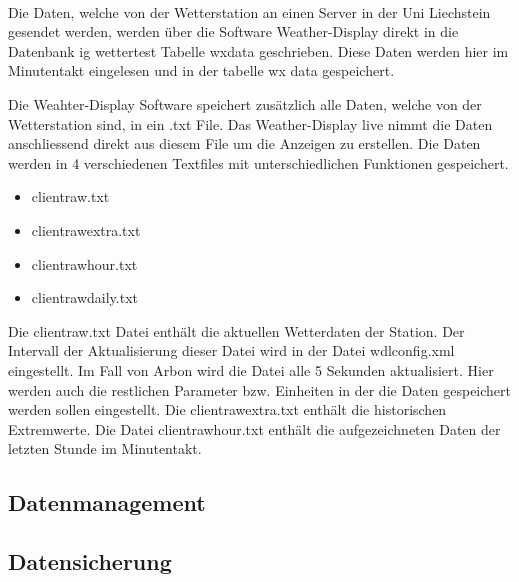 \\

Die Daten, welche von der Wetterstation an einen Server in der Uni Liechstein gesendet werden, werden über die Software Weather-Display direkt in die Datenbank ig wettertest Tabelle wxdata geschrieben. Diese Daten werden hier im Minutentakt eingelesen und in der tabelle wx data gespeichert. 


Die Weahter-Display Software speichert zusätzlich alle Daten, welche von der Wetterstation sind, in ein .txt File. Das Weather-Display live nimmt die Daten anschliessend direkt aus diesem File um die Anzeigen zu erstellen. Die Daten werden in 4 verschiedenen Textfiles mit unterschiedlichen Funktionen gespeichert.
\begin{itemize}  
\item clientraw.txt
\item clientrawextra.txt
\item clientrawhour.txt
\item clientrawdaily.txt
\end{itemize}


Die clientraw.txt Datei enthält die aktuellen Wetterdaten der Station. Der Intervall der Aktualisierung dieser Datei wird in der Datei wdlconfig.xml eingestellt. Im Fall von Arbon wird die Datei alle 5 Sekunden aktualisiert.  Hier werden auch die restlichen Parameter bzw. Einheiten in der die Daten gespeichert werden sollen eingestellt. Die clientrawextra.txt enthält die historischen Extremwerte. Die Datei clientrawhour.txt enthält die aufgezeichneten Daten der letzten Stunde im Minutentakt.\cite{WeatherDisplay} \\


\subsection{Datenmanagement}

\subsection{Datensicherung}


